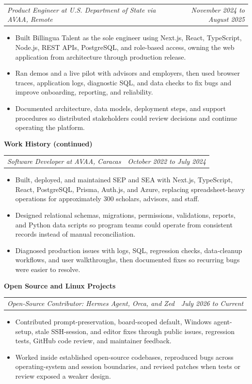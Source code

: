 \documentclass[10pt,letterpaper]{article}
\makeatletter
\newcommand{\bodyfont}{\fontsize{10.5}{15.75}\selectfont}
\newcommand{\sectiontitle}[1]{%
  \vspace{4pt}
  {\bodyfont\textbf{#1}}\par
  \nopagebreak[4]
  \vspace{2pt}
}
\newcommand{\roleline}[2]{%
  \begin{tabularx}{\textwidth}{@{}Xr@{}}
    \bodyfont\textit{#1} & \bodyfont\textit{#2}
  \end{tabularx}
  \nopagebreak[4]
  \vspace{1pt}
}
\makeatother
\begin{document}
\vspace{3pt}
\roleline{Product Engineer at U.S. Department of State via AVAA, Remote}{November 2024 to August 2025}
\begin{itemize}
  \item Built Billingua Talent as the sole engineer using Next.js, React, TypeScript, Node.js, REST APIs, PostgreSQL, and role-based access, owning the web application from architecture through production release.
  \item Ran demos and a live pilot with advisors and employers, then used browser traces, application logs, diagnostic SQL, and data checks to fix bugs and improve onboarding, reporting, and reliability.
  \item Documented architecture, data models, deployment steps, and support procedures so distributed stakeholders could review decisions and continue operating the platform.
\end{itemize}

\newpage
\sectiontitle{Work History (continued)}

\roleline{Software Developer at AVAA, Caracas}{October 2022 to July 2024}
\begin{itemize}
  \item Built, deployed, and maintained SEP and SEA with Next.js, TypeScript, React, PostgreSQL, Prisma, Auth.js, and Azure, replacing spreadsheet-heavy operations for approximately 300 scholars, advisors, and staff.
  \item Designed relational schemas, migrations, permissions, validations, reports, and Python data scripts so program teams could operate from consistent records instead of manual reconciliation.
  \item Diagnosed production issues with logs, SQL, regression checks, data-cleanup workflows, and user walkthroughs, then documented fixes so recurring bugs were easier to resolve.
\end{itemize}

\sectiontitle{Open Source and Linux Projects}

\roleline{Open-Source Contributor: Hermes Agent, Orca, and Zed}{July 2026 to Current}
\begin{itemize}
  \item Contributed prompt-preservation, board-scoped default, Windows agent-setup, stale SSH-session, and editor fixes through public issues, regression tests, GitHub code review, and maintainer feedback.
  \item Worked inside established open-source codebases, reproduced bugs across operating-system and session boundaries, and revised patches when tests or review exposed a weaker design.
\end{itemize}
\end{document}
